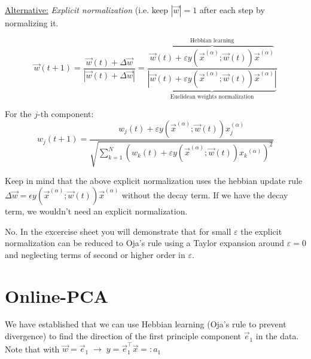 \underline{Alternative:} \emph{Explicit normalization} (i.e. keep $|\vec w| = 1$ after each step by normalizing it.

\begin{equation*}
	\vec{w}(t+1) = 
    \frac{\vec w(t) + \Delta \vec w}{|\vec w(t) + \Delta \vec w|} 
    = \frac
    {\overbrace{\vec{w}(t) + \varepsilon y(\vec{x}^{(\alpha)}; \vec{w}(t)) \vec{x}^{(\alpha)}}^{\text{Hebbian learning}}}
    {\underbrace{\left| \vec{w}(t) + \varepsilon y(\vec{x}^{(\alpha)}; \vec{w}(t)) \vec{x}^{(\alpha)} \right|}_{\text{Euclidean weights normalization}}}
\end{equation*}

For the $j$-th component:\\
\begin{equation*}
    w_j(t+1) = \frac
    {w_j(t) + \varepsilon y(\vec{x}^{(\alpha)}; \vec{w}(t)) x_j^{(\alpha)}}
    {\sqrt{ \sum_{k=1}^{N} \left( w_k(t) + \varepsilon y(\vec{x}^{(\alpha)}; \vec{w}(t)) {x_k}^{(\alpha)} \right)^2}}
\end{equation*}

Keep in mind that the above explicit normalization uses the hebbian update rule 
$\Delta \vec w = \epsilon y(\vec x^ {(\alpha)}; \vec w(t)) \vec x^{(\alpha)}$ without the decay term. 
If we have the decay term, we wouldn't need an explicit normalization.


No. In the excercise sheet you will demonstrate that for small $\varepsilon$ the explicit normalization can be reduced to Oja's rule using a Taylor expansion around $\varepsilon = 0$ and neglecting terms of second or higher order in $\varepsilon$. 

\newpage

\section{Online-PCA}

We have established that we can use Hebbian learning (Oja's rule to prevent divergence) 
to find the direction of the first principle component $\vec e_1$ in the data. \\

Note that with $\vec w = \vec e_1 \; \rightarrow \; y = \vec e_1^\top \vec x =: a_1$\\

